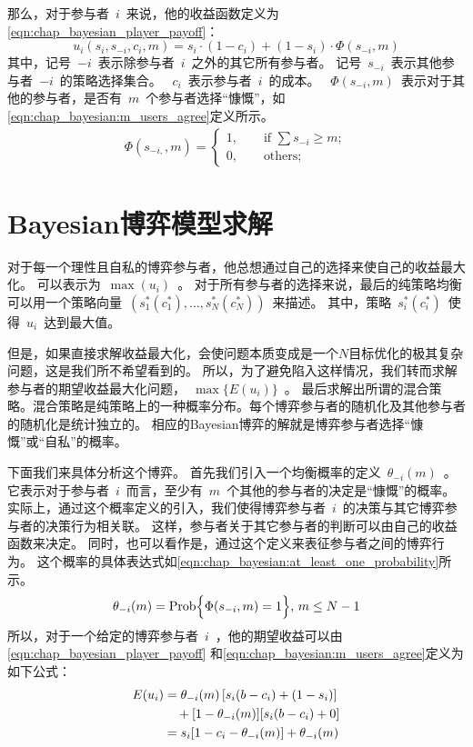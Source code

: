 那么，对于参与者~$i$~来说，他的收益函数定义为\eqref{eqn:chap_bayesian_player_payoff}：
\begin{equation}
 u_i(s_i, s_{-i}, c_i, m) = s_i\cdot (1 - c_i) + (1-s_i) \cdot \Phi(s_{-i},m)
\label{eqn:chap_bayesian_player_payoff}     
\end{equation}
其中，记号~$-i$~表示除参与者~$i$~之外的其它所有参与者。
记号~$s_{-i}$~表示其他参与者~$-i$~的策略选择集合。
~$c_i$~表示参与者~$i$~的成本。
~$\Phi(s_{-i},m)$~表示对于其他的参与者，是否有~$m$~个参与者选择“慷慨”，如\eqref{eqn:chap_bayesian:m_users_agree}定义所示。
\begin{align}
    \Phi(s_{-i,},m) = \begin{cases}
        1, \qquad \text{if } \sum s_{-i} \ge m;\\
        0, \qquad \text{others};
    \end{cases}
    \label{eqn:chap_bayesian:m_users_agree}
\end{align}

%
\section{Bayesian博弈模型求解}
对于每一个理性且自私的博弈参与者，他总想通过自己的选择来使自己的收益最大化。
可以表示为~$\max(u_i)$~。
对于所有参与者的选择来说，最后的纯策略均衡可以用一个策略向量~$( s_1^*(c_1^*),\ldots, s_N^*(c_N^*) )$~来描述。
其中，策略~$s_i^*(c_i^*)$~使得~$u_i$~达到最大值。

但是，如果直接求解收益最大化，会使问题本质变成是一个$N$目标优化的极其复杂问题，这是我们所不希望看到的。
所以，为了避免陷入这样情况，我们转而求解参与者的期望收益最大化问题，~$\max\{E(u_i)\}$~。
最后求解出所谓的混合策略。混合策略是纯策略上的一种概率分布。每个博弈参与者的随机化及其他参与者的随机化是统计独立的。
相应的Bayesian博弈的解就是博弈参与者选择“慷慨”或“自私”的概率。

下面我们来具体分析这个博弈。
首先我们引入一个均衡概率的定义~$\theta_{-i}(m)$~。
它表示对于参与者~$i$~而言，至少有~$m$~个其他的参与者的决定是“慷慨”的概率。
实际上，通过这个概率定义的引入，我们使得博弈参与者~$i$~的决策与其它博弈参与者的决策行为相关联。
这样，参与者关于其它参与者的判断可以由自己的收益函数来决定。
同时，也可以看作是，通过这个定义来表征参与者之间的博弈行为。
这个概率的具体表达式如\eqref{eqn:chap_bayesian:at_least_one_probability}所示。
\begin{equation}
    \theta_{-i}(m) = \hbox{Prob} \Bigl\{ \Phi( s_{-i},m) = 1 \Bigr\}, \, m\le N-1
    \label{eqn:chap_bayesian:at_least_one_probability} 
\end{equation}
所以，对于一个给定的博弈参与者~$i$~，他的期望收益可以由\eqref{eqn:chap_bayesian_player_payoff} 
和\eqref{eqn:chap_bayesian:m_users_agree}定义为如下公式：
\begin{align}
     E(u_i) &= \theta_{-i}(m)\left[s_i(b-c_i) +(1-s_i)\right] \notag \\
     & \quad + [1-\theta_{-i}(m)] [s_i(b-c_i) + 0] \notag\\ 
     &= s_i[1-c_i-\theta_{-i}(m)] + \theta_{-i}(m)
    \label{eqn:player_expe_payoff}
\end{align}


